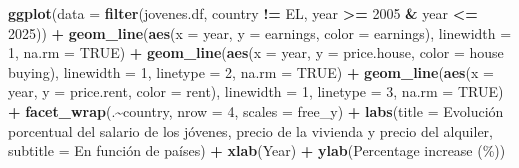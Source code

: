 \documentclass[water,article,submit,pdftex,moreauthors]{Definitions/mdpi}
\newenvironment{Shaded}{\begin{snugshade}}{\end{snugshade}}
\newcommand{\AttributeTok}[1]{\textcolor[rgb]{0.13,0.29,0.53}{#1}}
\newcommand{\ConstantTok}[1]{\textcolor[rgb]{0.56,0.35,0.01}{#1}}
\newcommand{\DecValTok}[1]{\textcolor[rgb]{0.00,0.00,0.81}{#1}}
\newcommand{\FunctionTok}[1]{\textcolor[rgb]{0.13,0.29,0.53}{\textbf{#1}}}
\newcommand{\NormalTok}[1]{#1}
\newcommand{\SpecialCharTok}[1]{\textcolor[rgb]{0.81,0.36,0.00}{\textbf{#1}}}
\newcommand{\StringTok}[1]{\textcolor[rgb]{0.31,0.60,0.02}{#1}}
\begin{document}
\begin{Shaded}
\begin{Highlighting}[]
\FunctionTok{ggplot}\NormalTok{(}\AttributeTok{data =} \FunctionTok{filter}\NormalTok{(jovenes.df, country }\SpecialCharTok{!=} \StringTok{\textquotesingle{}EL\textquotesingle{}}\NormalTok{, year }\SpecialCharTok{\textgreater{}=} \DecValTok{2005} \SpecialCharTok{\&}\NormalTok{ year }\SpecialCharTok{\textless{}=} \DecValTok{2025}\NormalTok{)) }\SpecialCharTok{+} 
  \FunctionTok{geom\_line}\NormalTok{(}\FunctionTok{aes}\NormalTok{(}\AttributeTok{x =}\NormalTok{ year, }\AttributeTok{y =}\NormalTok{ earnings, }\AttributeTok{color =} \StringTok{\textquotesingle{}earnings\textquotesingle{}}\NormalTok{), }\AttributeTok{linewidth =} \DecValTok{1}\NormalTok{, }\AttributeTok{na.rm =} \ConstantTok{TRUE}\NormalTok{) }\SpecialCharTok{+} 
  \FunctionTok{geom\_line}\NormalTok{(}\FunctionTok{aes}\NormalTok{(}\AttributeTok{x =}\NormalTok{ year, }\AttributeTok{y =}\NormalTok{ price.house, }\AttributeTok{color =} \StringTok{\textquotesingle{}house buying\textquotesingle{}}\NormalTok{), }\AttributeTok{linewidth =} \DecValTok{1}\NormalTok{, }\AttributeTok{linetype =} \DecValTok{2}\NormalTok{, }\AttributeTok{na.rm =} \ConstantTok{TRUE}\NormalTok{) }\SpecialCharTok{+} 
  \FunctionTok{geom\_line}\NormalTok{(}\FunctionTok{aes}\NormalTok{(}\AttributeTok{x =}\NormalTok{ year, }\AttributeTok{y =}\NormalTok{ price.rent, }\AttributeTok{color =} \StringTok{\textquotesingle{}rent\textquotesingle{}}\NormalTok{), }\AttributeTok{linewidth =} \DecValTok{1}\NormalTok{, }\AttributeTok{linetype =} \DecValTok{3}\NormalTok{, }\AttributeTok{na.rm =} \ConstantTok{TRUE}\NormalTok{) }\SpecialCharTok{+} \FunctionTok{facet\_wrap}\NormalTok{(.}\SpecialCharTok{\textasciitilde{}}\NormalTok{country, }\AttributeTok{nrow =} \DecValTok{4}\NormalTok{, }\AttributeTok{scales =} \StringTok{\textquotesingle{}free\_y\textquotesingle{}}\NormalTok{) }\SpecialCharTok{+} \FunctionTok{labs}\NormalTok{(}\AttributeTok{title =} \StringTok{\textquotesingle{}Evolución porcentual del salario de los jóvenes, precio de la vivienda y precio del alquiler\textquotesingle{}}\NormalTok{, }\AttributeTok{subtitle =} \StringTok{\textquotesingle{}En función de países\textquotesingle{}}\NormalTok{) }\SpecialCharTok{+} \FunctionTok{xlab}\NormalTok{(}\StringTok{\textquotesingle{}Year\textquotesingle{}}\NormalTok{) }\SpecialCharTok{+} \FunctionTok{ylab}\NormalTok{(}\StringTok{\textquotesingle{}Percentage increase (\%)\textquotesingle{}}\NormalTok{)}
\end{Highlighting}
\end{Shaded}
\end{document}
